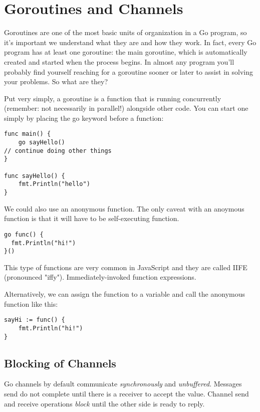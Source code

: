 \chapter{Goroutines and Channels}

Goroutines are one of the most basic units of organization in a Go program, so it’s
important we understand what they are and how they work. In fact, every Go program
has at least one goroutine: the main goroutine, which is automatically created
and started when the process begins. In almost any program you’ll probably find
yourself reaching for a goroutine sooner or later to assist in solving your problems. So
what are they?

Put very simply, a goroutine is a function that is running concurrently (remember:
not necessarily in parallel!) alongside other code. You can start one simply by placing
the go keyword before a function:


\begin{verbatim}
func main() {
    go sayHello()
// continue doing other things
}

func sayHello() {
    fmt.Println("hello")
}
\end{verbatim}


We could also use an anonymous function. The only caveat with an anoymous function is that it will have to be self-executing function.

\begin{verbatim}
go func() {
  fmt.Println("hi!")
}()
\end{verbatim}

This type of functions are very common in JavaScript and they are called IIFE (pronounced "iffy"). Immediately-invoked function expressions.

Alternatively, we can assign the function to a variable and call the anonymous function like this:


\begin{verbatim}
sayHi := func() {
	fmt.Println("hi!")
}
\end{verbatim}




\section{Blocking of Channels}


Go channels by default communicate \textit{synchronously} and \textit{unbuffered}. Messages send do not complete until there is a receiver to accept the value. Channel send and receive operations \textit{block} until the other side is ready to reply. 


